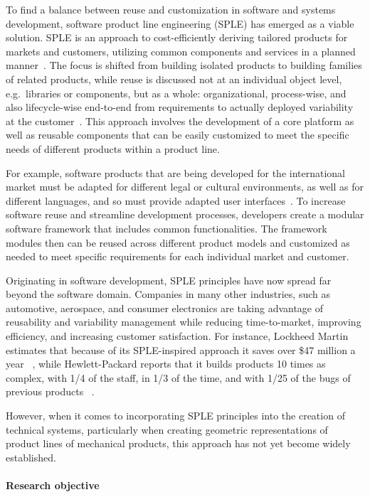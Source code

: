 \documentclass[sigconf,review]{acmart}
\begin{document}
To find a balance between reuse and customization in software and systems development, software product line engineering (SPLE) has emerged as a viable solution. 
SPLE is an approach to cost-efficiently deriving tailored products for markets and customers, utilizing common components and services in a planned manner~\cite{Runeson_2012}.
The focus is shifted from building isolated products to building families of related products, while reuse is discussed not at an individual object level, e.g.~libraries or components, but as a whole: organizational, process-wise, and also lifecycle-wise end-to-end from requirements to actually deployed variability at the customer~\cite{Schwanninger_2009}. 
This approach involves the development of a core platform as well as reusable components that can be easily customized to meet the specific needs of different products within a product line. 

For example, software products that are being developed for the international market must be adapted for different legal or cultural environments, as well as for different languages, and so must provide adapted user interfaces~\cite{Beuche_2007}. 
To increase software reuse and streamline development processes, developers create a modular software framework that includes common functionalities. 
The framework modules then can be reused across different product models and customized as needed to meet specific requirements for each individual market and customer.

Originating in software development, SPLE principles have now spread far beyond the software domain. 
Companies in many other industries, such as automotive, aerospace, and consumer electronics are taking advantage of reusability and variability management while reducing time-to-market, improving efficiency, and increasing customer satisfaction. 
For instance, Lockheed Martin estimates that because of its SPLE-inspired approach it saves over \$47 million a year ~\cite{Gregg_2015}, while Hewlett-Packard reports that it builds products 10 times as complex, with 1/4 of the staff, in 1/3 of the time, and with 1/25 of the bugs of previous products ~\cite{Mebane_2007}.

However, when it comes to incorporating SPLE principles into the creation of technical systems, particularly when creating geometric representations of product lines of mechanical products, this approach has not yet become widely established. 

\paragraph{Research objective}
\end{document}
